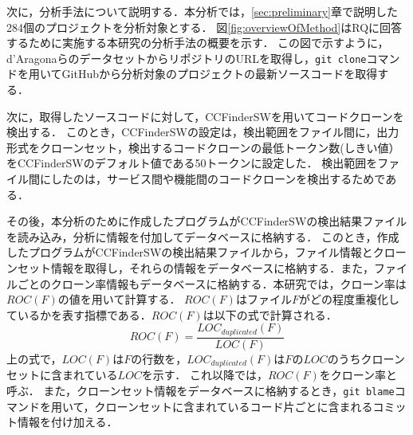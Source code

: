 \documentclass[T,J]{fose}
\begin{document}
次に，分析手法について説明する．本分析では，\ref{sec:preliminary}章で説明した284個のプロジェクトを分析対象とする．
図\ref{fig:overviewOfMethod}はRQに回答するために実施する本研究の分析手法の概要を示す．
この図で示すように，d'AragonaらのデータセットからリポジトリのURLを取得し，\verb|git clone|コマンドを用いてGitHubから分析対象のプロジェクトの最新ソースコードを取得する．


次に，取得したソースコードに対して，CCFinderSWを用いてコードクローンを検出する．
このとき，CCFinderSWの設定は，検出範囲をファイル間に，出力形式をクローンセット，検出するコードクローンの最低トークン数(しきい値）をCCFinderSWのデフォルト値である50トークンに設定した．
検出範囲をファイル間にしたのは，サービス間や機能間のコードクローンを検出するためである．


その後，本分析のために作成したプログラムがCCFinderSWの検出結果ファイルを読み込み，分析に情報を付加してデータベースに格納する．
このとき，作成したプログラムがCCFinderSWの検出結果ファイルから，ファイル情報とクローンセット情報を取得し，それらの情報をデータベースに格納する．また，ファイルごとのクローン率情報もデータベースに格納する．本研究では，クローン率は$ROC(F)$の値を用いて計算する．
$ROC(F)$はファイル$F$がどの程度重複化しているかを表す指標である．$ROC(F)$は以下の式で計算される．
\[ROC(F) = \frac{LOC_{duplicated}(F)}{LOC(F)}\]
上の式で，$LOC(F)$は$F$の行数を，$LOC_{duplicated}(F)$は$F$の$LOC$のうちクローンセットに含まれている$LOC$を示す．
これ以降では，$ROC(F)$をクローン率と呼ぶ．
また，クローンセット情報をデータベースに格納するとき，\verb|git blame|コマンドを用いて，クローンセットに含まれているコード片ごとに含まれるコミット情報を付け加える．
\end{document}
